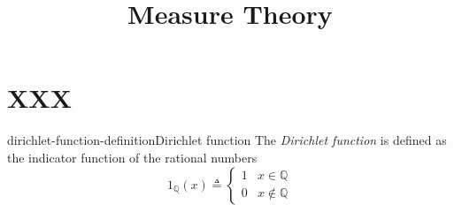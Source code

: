 \documentclass[preview]{standalone}
\begin{document}
\title{Measure Theory}
\genpage


\section{XXX}

\begin{snippetdefinition}{dirichlet-function-definition}{Dirichlet function}
    The \textit{Dirichlet function} is defined as the indicator function of the rational numbers
    \[
        1_{\mathbb{Q}}(x) \triangleq \begin{cases}
            1 & x \in \mathbb{Q} \\
            0 & x \notin \mathbb{Q}
        \end{cases}
    \]
\end{snippetdefinition}

\end{document}
